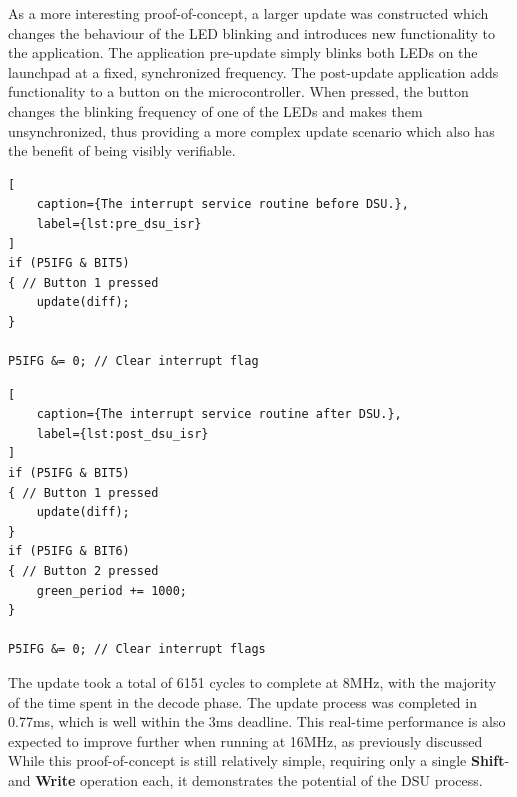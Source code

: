 As a more interesting proof-of-concept, a larger update was constructed which changes the behaviour of the LED blinking and introduces new functionality to the application. The application pre-update simply blinks both LEDs on the launchpad at a fixed, synchronized frequency. The post-update application adds functionality to a button on the microcontroller. When pressed, the button changes the blinking frequency of one of the LEDs and makes them unsynchronized, thus providing a more complex update scenario which also has the benefit of being visibly verifiable. 
\begin{framed}
\noindent\begin{minipage}{.45\textwidth}
\begin{lstlisting}[
    caption={The interrupt service routine before DSU.},
    label={lst:pre_dsu_isr}
]
if (P5IFG & BIT5)
{ // Button 1 pressed
    update(diff);
}

P5IFG &= 0; // Clear interrupt flag
\end{lstlisting}
\end{minipage}\hfill
\noindent\begin{minipage}{.45\textwidth}
\begin{lstlisting}[
    caption={The interrupt service routine after DSU.},
    label={lst:post_dsu_isr}
]
if (P5IFG & BIT5)
{ // Button 1 pressed
    update(diff);
} 
if (P5IFG & BIT6)
{ // Button 2 pressed
    green_period += 1000;
}

P5IFG &= 0; // Clear interrupt flags
\end{lstlisting}
\end{minipage}
\end{framed}\hfill

The update took a total of 6151 cycles to complete at 8MHz, with the majority of the time spent in the decode phase. The update process was completed in 0.77ms, which is well within the 3ms deadline. This real-time performance is also expected to improve further when running at 16MHz, as previously discussed While this proof-of-concept is still relatively simple, requiring only a single \textbf{Shift}- and \textbf{Write} operation each, it demonstrates the potential of the DSU process. 
